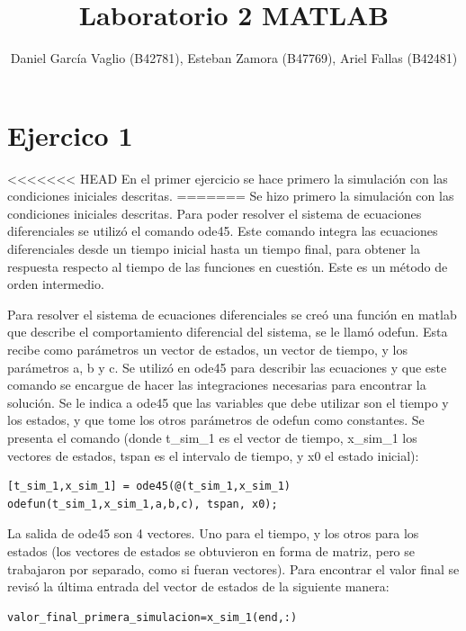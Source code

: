 \documentclass[12pt,letterpaper]{article}
\begin{document}
\title{Laboratorio 2 MATLAB}
\author{Daniel García Vaglio (B42781), Esteban Zamora (B47769), Ariel Fallas (B42481)}
\maketitle

\section{Ejercico 1}
<<<<<<< HEAD
En el primer ejercicio se hace primero la simulación con las condiciones iniciales descritas. 
=======
Se hizo primero la simulación con las condiciones iniciales descritas. Para poder resolver el sistema de ecuaciones diferenciales se utilizó el comando ode45. Este comando integra las ecuaciones diferenciales desde un tiempo inicial hasta un tiempo final, para obtener la respuesta respecto al tiempo de las funciones en cuestión. Este es un método de orden intermedio. 

Para resolver el sistema de ecuaciones diferenciales se creó una función en matlab que describe el comportamiento diferencial del sistema, se le llamó odefun. Esta recibe como parámetros un vector de estados, un vector de tiempo, y los parámetros a, b y c. Se utilizó en ode45 para describir las ecuaciones y que este comando se encargue de hacer las integraciones necesarias para encontrar la solución. Se le indica  a ode45 que las variables que debe utilizar son el tiempo y los estados, y que tome los otros parámetros de odefun como constantes. Se presenta el comando (donde t\_sim\_1 es el vector de tiempo, x\_sim\_1 los vectores de estados, tspan es el intervalo de tiempo, y x0 el estado inicial):

\begin{lstlisting}[style=Matlab-editor, basicstyle=\mlttfamily]
    [t_sim_1,x_sim_1] = ode45(@(t_sim_1,x_sim_1) odefun(t_sim_1,x_sim_1,a,b,c), tspan, x0);
\end{lstlisting}

La salida de ode45 son 4 vectores. Uno para el tiempo, y los otros para los estados (los vectores de estados se obtuvieron en forma de matriz, pero se trabajaron por separado, como si fueran vectores). Para encontrar el valor final se revisó la última entrada del vector de estados de la siguiente manera:


\begin{lstlisting}[style=Matlab-editor, basicstyle=\mlttfamily]
    valor_final_primera_simulacion=x_sim_1(end,:)
\end{lstlisting}
\end{document}
